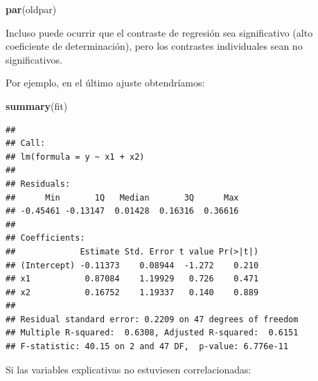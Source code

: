 \documentclass[
  spanish,
]{book}
\newenvironment{Shaded}{\begin{snugshade}}{\end{snugshade}}
\newcommand{\KeywordTok}[1]{\textcolor[rgb]{0.13,0.29,0.53}{\textbf{#1}}}
\newcommand{\NormalTok}[1]{#1}
\theoremstyle{break}
\theoremstyle{definition}
\theoremstyle{definition}
\theoremstyle{definition}
\theoremstyle{remark}
\begin{document}
\begin{Shaded}
\begin{Highlighting}[]
\KeywordTok{par}\NormalTok{(oldpar)}
\end{Highlighting}
\end{Shaded}

Incluso puede ocurrir que el contraste de regresión sea significativo (alto coeficiente de determinación), pero los contrastes individuales sean no significativos.

Por ejemplo, en el último ajuste obtendríamos:

\begin{Shaded}
\begin{Highlighting}[]
\KeywordTok{summary}\NormalTok{(fit)}
\end{Highlighting}
\end{Shaded}

\begin{verbatim}
## 
## Call:
## lm(formula = y ~ x1 + x2)
## 
## Residuals:
##      Min       1Q   Median       3Q      Max 
## -0.45461 -0.13147  0.01428  0.16316  0.36616 
## 
## Coefficients:
##             Estimate Std. Error t value Pr(>|t|)
## (Intercept) -0.11373    0.08944  -1.272    0.210
## x1           0.87084    1.19929   0.726    0.471
## x2           0.16752    1.19337   0.140    0.889
## 
## Residual standard error: 0.2209 on 47 degrees of freedom
## Multiple R-squared:  0.6308, Adjusted R-squared:  0.6151 
## F-statistic: 40.15 on 2 and 47 DF,  p-value: 6.776e-11
\end{verbatim}

Si las variables explicativas no estuviesen correlacionadas:
\end{document}
